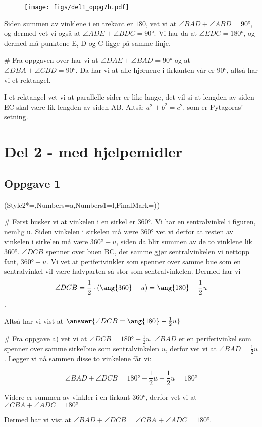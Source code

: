 \begin{easylist}[enumerate]
	\begin{figure}[htbp]
		\centering
		\texttt{[image: figs/del1\_oppg7b.pdf]}
		\label{fig:del1_oppg7b}
	\end{figure}
	
	Siden summen av vinklene i en trekant er $180$, vet vi at $\angle BAD + \angle  ABD = \ang{90}$, og dermed vet vi også at $\angle ADE + \angle BDC = \ang{90}$. Vi har da at $\angle EDC  = \ang{180}$, og dermed må punktene E, D og C ligge på samme linje.
	
	# Fra oppgaven over har vi at $\angle DAE + \angle BAD = \ang{90}$ og at $\angle DBA + \angle CBD = \ang{90}$. Da har vi at alle hjørnene i firkanten vår er $\ang{90}$, altså har vi et rektangel. 
	
	I et rektangel vet vi at parallelle sider er like lange, det vil si at lengden av siden EC skal være lik lengden av siden AB. Altså: $a^2 + b^2 = c^2$, som er Pytagoras' setning.
	
\end{easylist}
\newpage


\section*{Del 2 - med hjelpemidler}

\subsection*{Oppgave 1}
\begin{easylist}[enumerate]
	\ListProperties(Style2*=,Numbers=a,Numbers1=l,FinalMark={)})
	
	# Først husker vi at vinkelen i en sirkel er $\ang{360}$. Vi har en sentralvinkel i figuren, nemlig u. Siden vinkelen i sirkelen må være $\ang{360}$ vet vi derfor at resten av vinkelen i sirkelen må være $\ang{360} - u$, siden da blir summen av de to vinklene lik $\ang{360}$. $\angle DCB$ spenner over buen BC, det samme gjør sentralvinkelen vi nettopp fant, $\ang{360} - u$. Vi vet at periferivinkler som spenner over samme bue som en sentralvinkel vil være halvparten så stor som sentralvinkelen. Dermed har vi $$\angle DCB = \frac{1}{2} \cdot (\ang{360} - u) \\ = \ang{180} - \frac{1}{2}u$$.
	
	Altså har vi vist at $\answer{\angle DCB = \ang{180} - \frac{1}{2}u}$
	
	# Fra oppgave a) vet vi at $\angle DCB = \ang{180} - \frac{1}{2}u$. $\angle BAD$ er en periferivinkel som spenner over samme sirkelbue som sentralvinkelen $u$, derfor vet vi at  $\angle BAD = \frac{1}{2}u$. Legger vi nå sammen disse to vinkelene får vi:
	
	$$\angle BAD + \angle DCB = \ang{180} - \frac{1}{2}u + \frac{1}{2}u = \ang{180}$$
	
	Videre er summen av vinkler i en firkant $\ang{360}$, derfor vet vi at $\angle CBA + \angle ADC = \ang{180}$
	
	Dermed har vi vist at $\angle BAD + \angle DCB = \angle CBA + \angle ADC = \ang{180}$.
	
	
\end{easylist}
